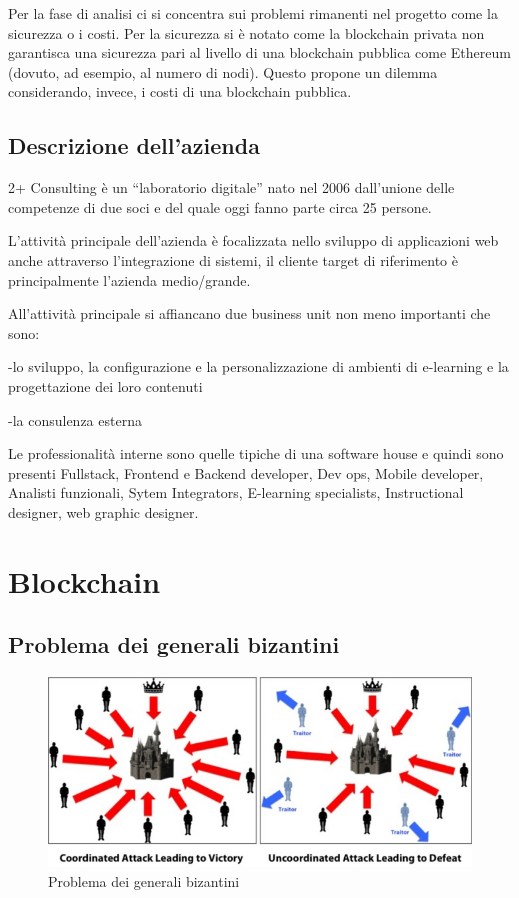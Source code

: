 \documentclass[11pt,a4paper,titlepage]{report}
\begin{document}
Per la fase di analisi ci si concentra sui problemi rimanenti nel progetto come la sicurezza o i costi.
Per la sicurezza si è notato come la blockchain privata non garantisca una sicurezza pari al livello di una blockchain pubblica come Ethereum (dovuto, ad esempio, al numero di nodi). Questo propone un dilemma considerando, invece, i costi di una blockchain pubblica.


\section{Descrizione dell'azienda}
2+ Consulting è un “laboratorio digitale” nato nel 2006 dall’unione delle competenze di due soci e del quale oggi fanno parte circa 25 persone.

L’attività principale dell’azienda è focalizzata nello sviluppo di applicazioni web anche attraverso l’integrazione di sistemi, il cliente target di riferimento è principalmente l’azienda medio/grande.

All’attività principale si affiancano due business unit non meno importanti che sono:

-lo sviluppo, la configurazione e la personalizzazione  di ambienti di e-learning e la progettazione dei loro contenuti

-la consulenza esterna

Le professionalità interne sono quelle tipiche di una software house e quindi sono presenti Fullstack, Frontend e Backend developer, Dev ops,  Mobile developer, Analisti funzionali, Sytem Integrators, E-learning specialists, Instructional designer, web graphic designer.

\chapter{Blockchain}
\section{Problema dei generali bizantini}
\begin{figure}[h]
	\includegraphics[width=\textwidth]{BF}
	\centering
	\caption{Problema dei generali bizantini}
	\label{fig:ByzantinFault}
\end{figure}
\end{document}
